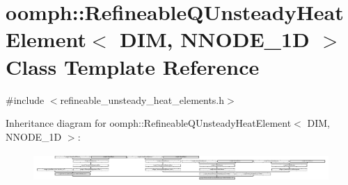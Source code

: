 \hypertarget{classoomph_1_1RefineableQUnsteadyHeatElement}{}\section{oomph\+:\+:Refineable\+Q\+Unsteady\+Heat\+Element$<$ D\+IM, N\+N\+O\+D\+E\+\_\+1D $>$ Class Template Reference}
\label{classoomph_1_1RefineableQUnsteadyHeatElement}


{\ttfamily \#include $<$refineable\+\_\+unsteady\+\_\+heat\+\_\+elements.\+h$>$}

Inheritance diagram for oomph\+:\+:Refineable\+Q\+Unsteady\+Heat\+Element$<$ D\+IM, N\+N\+O\+D\+E\+\_\+1D $>$\+:\begin{figure}[H]
\begin{center}
\leavevmode
\includegraphics[height=1.108179cm]{classoomph_1_1RefineableQUnsteadyHeatElement}
\end{center}
\end{figure}
